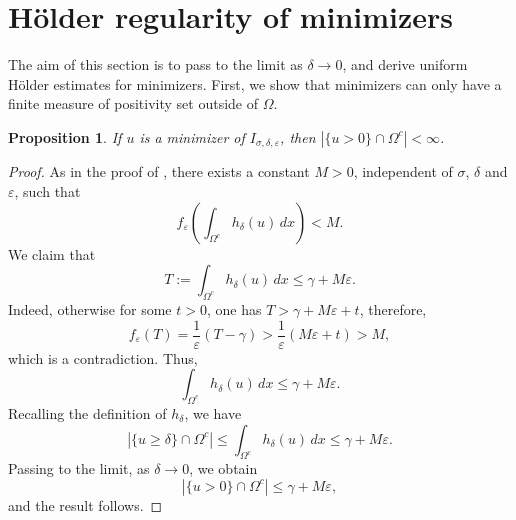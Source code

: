 \documentclass[11pt, reqno]{amsart}
\newtheorem{proposition}{Proposition}
\numberwithin{equation}{section}
\numberwithin{theorem}{section}
\numberwithin{lemma}{section}
\numberwithin{corollary}{section}
\numberwithin{remark}{section}
\numberwithin{proposition}{section}
\numberwithin{definition}{section}
\begin{document}
\smallskip

\section{H\"older regularity of minimizers}\label{s4}
The aim of this section is to pass to the limit as $\delta\to0$, and derive uniform H\"older estimates for minimizers. First, we show that minimizers can only have a finite measure of positivity set outside of $\Omega$. 
\begin{proposition}\label{new proposition}
    If $u$ is a minimizer of $I_{\sigma,\delta,\varepsilon}$, then $|\{u>0\}\cap\Omega^c|<\infty$.
\end{proposition}
\begin{proof}
    As in the proof of , there exists a constant $M>0$, independent of $\sigma$, $\delta$ and $\varepsilon$, such that
  $$  f_\varepsilon\left(\int_{\Omega^c}h_\delta(u)\,dx\right)<M.
  $$
  We claim that 
  $$
  T:=\int_{\Omega^c}h_\delta(u)\,dx\le\gamma+M\varepsilon.
  $$
  Indeed, otherwise for some $t>0$, one has $T>\gamma+M\varepsilon+t$, therefore,
  $$
  f_\varepsilon(T)=\frac{1}{\varepsilon}(T-\gamma)>\frac{1}{\varepsilon}(M\varepsilon+t)>M,
  $$
  which is a contradiction. Thus, 
  $$
  \int_{\Omega^c}h_\delta(u)\,dx\le\gamma+M\varepsilon.
  $$
  Recalling the definition of $h_\delta$, we have 
  $$
  |\{u\ge\delta\}\cap\Omega^c|\le
  \int_{\Omega^c}h_\delta(u)\,dx\le\gamma+M\varepsilon.
  $$
  Passing to the limit, as $\delta\to0$, we obtain  
  $$
  |\{u>0\}\cap\Omega^c|\le\gamma+M\varepsilon,
  $$
  and the result follows.
\end{proof}
\end{document}
